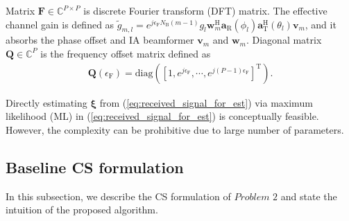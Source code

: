 \documentclass[journal]{IEEEtran}
\newcommand{\tx}[0]{\text{T}}
\newcommand{\rx}[0]{\text{R}}
\newcommand{\hermitian}[0]{\text{H}}
\newcommand{\transpose}[0]{\text{T}}
\newcommand{\CFO}[0]{\epsilon_{\text{F}}}
\newcommand{\Nb}[0]{N_{\text{B}}}
\begin{document}
Matrix $\mathbf{F}\in\mathbb{C}^{P\times P}$ is discrete Fourier transform (DFT) matrix. The effective channel gain is defined as $\tilde{g}_{m,l} = e^{j\CFO\Nb(m-1)}g_l\mathbf{w}_m^{\hermitian}\mathbf{a}_{\rx}(\phi_l)\mathbf{a}^{\hermitian}_{\tx}(\theta_l)\mathbf{v}_m$, and it absorbs the phase offset and IA beamformer $\mathbf{v}_m$ and $\mathbf{w}_m$. Diagonal matrix $\mathbf{Q}\in \mathbb{C}^{P}$ is the frequency offset matrix defined as
\begin{align}
\mathbf{Q}(\CFO) = \mathrm{diag}\left(\left[1,e^{j\CFO},\cdots,e^{j(P-1)\CFO}\right]^{\transpose}\right).
\label{eq:Q_matrix}
\end{align}

Directly estimating $\boldsymbol{\xi}$ from (\ref{eq:received_signal_for_est}) via maximum likelihood (ML) in (\ref{eq:received_signal_for_est}) is conceptually feasible. However, the complexity can be prohibitive due to large number of parameters. 
%
%
\subsection{Baseline CS formulation}

In this subsection, we describe the CS formulation of $\textit{Problem 2}$ and state the intuition of the proposed algorithm.
\end{document}
